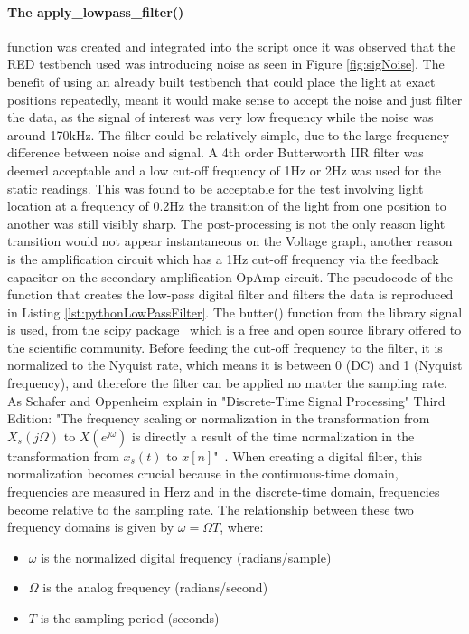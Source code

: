 \paragraph{The apply\_lowpass\_filter()} function was created and integrated into the script once it was observed that the RED testbench used was introducing noise as seen in Figure \ref{fig:sigNoise}. The benefit of using an already built testbench that could place the light at exact positions repeatedly, meant it would make sense to accept the noise and just filter the data, as the signal of interest was very low frequency while the noise was around 170kHz. The filter could be relatively simple, due to the large frequency difference between noise and signal. A 4th order Butterworth IIR filter was deemed acceptable and a low cut-off frequency of 1Hz or 2Hz was used for the static readings. This was found to be acceptable for the test involving light location at a frequency of 0.2Hz the transition of the light from one position to another was still visibly sharp. The post-processing is not the only reason light transition would not appear instantaneous on the Voltage graph, another reason is the amplification circuit which has a 1Hz cut-off frequency via the feedback capacitor on the secondary-amplification OpAmp circuit. \label{LowPassFilter}
The pseudocode of the function that creates the low-pass digital filter and filters the data is reproduced in Listing \ref{lst:pythonLowPassFilter}. The butter() function from the library signal is used, from the scipy package~\cite{RefWorks:butter} which is a free and open source library offered to the scientific community. Before feeding the cut-off frequency to the filter, it is normalized to the Nyquist rate, which means it is between 0 (DC) and 1 (Nyquist frequency), and therefore the filter can be applied no matter the sampling rate. As Schafer and Oppenheim explain in "Discrete-Time Signal Processing" Third Edition:
"The frequency scaling or normalization in the transformation from $ X_s(j\Omega) \text{ to } X(e^{j\omega})$ is directly a result of the time normalization in the transformation from $x_s(t) \text{ to } x[n]$"~\cite[p.171]{RefWorks:oppenheim2013discrete-time}.
When creating a digital filter, this normalization becomes crucial because in the continuous-time domain, frequencies are measured in Herz and in the discrete-time domain, frequencies become relative to the sampling rate.
The relationship between these two frequency domains is given by $\omega = \Omega T$, where:

\begin{itemize}
    \item $\omega$ is the normalized digital frequency (radians/sample)
    \item $\Omega$ is the analog frequency (radians/second)
    \item $T$ is the sampling period (seconds)
\end{itemize}

